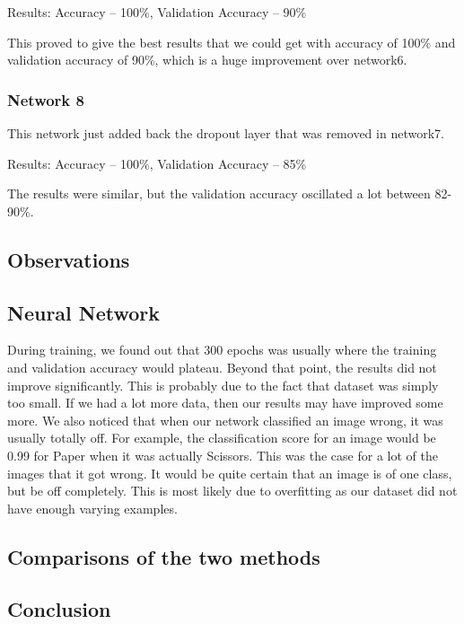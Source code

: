 Results: Accuracy – 100\%, Validation Accuracy – 90\%

This proved to give the best results that we could get with accuracy of 100\% and validation accuracy of 90\%, which is a huge improvement over network6.
\subsubsection{Network 8}

This network just added back the dropout layer that was removed in network7.

Results: Accuracy – 100\%, Validation Accuracy – 85\%

The results were similar, but the validation accuracy oscillated a lot between 82-90\%.
\subsection{Observations}
\subsection{Neural Network}
During training, we found out that 300 epochs was usually where the training and validation accuracy would plateau. Beyond that point, the results did not improve significantly. This is probably due to the fact that dataset was simply too small. If we had a lot more data, then our results may have improved some more.
We also noticed that when our network classified an image wrong, it was usually totally off. For example, the classification score for an image would be 0.99 for Paper when it was actually Scissors. This was the case for a lot of the images that it got wrong. It would be quite certain that an image is of one class, but be off completely. This is most likely due to overfitting as our dataset did not have enough varying examples.
\subsection{Comparisons of the two methods}
\subsection{Conclusion}
